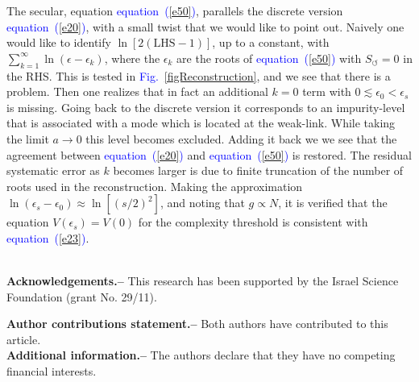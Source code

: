 \documentclass[aps,pre,floats,floatfix,twocolumn]{revtex4}
\newcommand{\Eq}[1]{\textcolor{blue}{{equation}\!~(\ref{#1})}}
\newcommand{\Fig}[1]{\textcolor{blue}{Fig.}\!\!~\ref{#1}}
\newcommand{\sect}[1]{{\bf #1.-- }}
\newcommand{\hidea}[1]{{#1}}
\begin{document}
 
The secular, equation \Eq{e50}, parallels the discrete version \Eq{e20}, 
with a small twist that we would like to point out.
Naively one would like to identify $\ln [2 (\text{LHS} -1)]$, 
up to a constant, with $\sum_{k=1}^{\infty} \ln(\epsilon-\epsilon_k)$, 
where the $\epsilon_k$ are the roots of \Eq{e50} with $S_{\circlearrowleft}{=}0$ 
in the RHS. This is tested in \Fig{figReconstruction}, 
and we see that there is a problem. Then one realizes 
that in fact an additional $k=0$ term with ${0 \lesssim \epsilon_0 < \epsilon_s}$ 
is missing. Going back to the discrete version it corresponds 
to an impurity-level that is associated with a mode which is located 
at the weak-link.
While taking the limit ${a\rightarrow0}$ this level becomes excluded.
Adding it back we we see that the agreement between \Eq{e20}      
and \Eq{e50} is restored. The residual systematic error as $k$ becomes 
larger is due to finite truncation of the number of roots used in the reconstruction. 
%
Making the approximation ${\ln(\epsilon_s-\epsilon_0) \approx \ln[(s/2)^2]}$,  
and noting that ${g\propto N}$, it is verified that the 
equation  ${V(\epsilon_s) = V(0)}$  for the complexity threshold 
is consistent with \Eq{e23}. 


{}


%


\onecolumngrid

\ \\ 

\sect{Acknowledgements}
%
This research has been supported by the Israel Science Foundation (grant No. 29/11). 
\\


\hidea{

\sect{Author contributions statement}
%
Both authors have contributed to this article. 
\\

\sect{Additional information} 
%
The authors declare that they have no competing financial interests.

}
\end{document}
